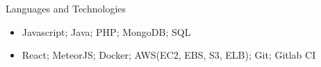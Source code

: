 \documentclass[]{mcdowellcv}
\begin{document}
	\begin{cvsection}{Languages and Technologies}
		\begin{cvsubsection}{}{}{}	
			\begin{itemize}
				\item Javascript; Java; PHP; MongoDB; SQL 
				\item React; MeteorJS; Docker; AWS(EC2, EBS, S3, ELB); Git; Gitlab CI
			\end{itemize}
		\end{cvsubsection}
	\end{cvsection}
	
\end{document}
